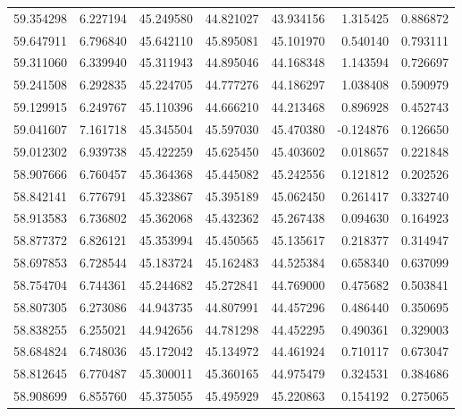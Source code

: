 \begin{tabular}{rrrrrrr}
 59.354298 &   6.227194 &         45.249580 &         44.821027 &         43.934156 &  1.315425 &  0.886872 \\
 59.647911 &   6.796840 &         45.642110 &         45.895081 &         45.101970 &  0.540140 &  0.793111 \\
 59.311060 &   6.339940 &         45.311943 &         44.895046 &         44.168348 &  1.143594 &  0.726697 \\
 59.241508 &   6.292835 &         45.224705 &         44.777276 &         44.186297 &  1.038408 &  0.590979 \\
 59.129915 &   6.249767 &         45.110396 &         44.666210 &         44.213468 &  0.896928 &  0.452743 \\
 59.041607 &   7.161718 &         45.345504 &         45.597030 &         45.470380 & -0.124876 &  0.126650 \\
 59.012302 &   6.939738 &         45.422259 &         45.625450 &         45.403602 &  0.018657 &  0.221848 \\
 58.907666 &   6.760457 &         45.364368 &         45.445082 &         45.242556 &  0.121812 &  0.202526 \\
 58.842141 &   6.776791 &         45.323867 &         45.395189 &         45.062450 &  0.261417 &  0.332740 \\
 58.913583 &   6.736802 &         45.362068 &         45.432362 &         45.267438 &  0.094630 &  0.164923 \\
 58.877372 &   6.826121 &         45.353994 &         45.450565 &         45.135617 &  0.218377 &  0.314947 \\
 58.697853 &   6.728544 &         45.183724 &         45.162483 &         44.525384 &  0.658340 &  0.637099 \\
 58.754704 &   6.744361 &         45.244682 &         45.272841 &         44.769000 &  0.475682 &  0.503841 \\
 58.807305 &   6.273086 &         44.943735 &         44.807991 &         44.457296 &  0.486440 &  0.350695 \\
 58.838255 &   6.255021 &         44.942656 &         44.781298 &         44.452295 &  0.490361 &  0.329003 \\
 58.684824 &   6.748036 &         45.172042 &         45.134972 &         44.461924 &  0.710117 &  0.673047 \\
 58.812645 &   6.770487 &         45.300011 &         45.360165 &         44.975479 &  0.324531 &  0.384686 \\
 58.908699 &   6.855760 &         45.375055 &         45.495929 &         45.220863 &  0.154192 &  0.275065 \\

\end{tabular}
